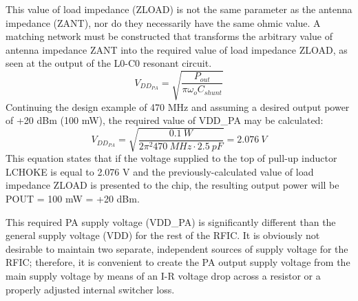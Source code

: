         This value of load impedance (ZLOAD) is not the same parameter as the antenna impedance (ZANT), nor 
        do they necessarily have the same ohmic value. A matching network must be constructed that 
        transforms the arbitrary value of antenna impedance ZANT into the required value of load impedance 
        ZLOAD, as seen at the output of the L0-C0 resonant circuit.
        \begin{equation}\label{EXP001:eq_spirit05}
          V_{DD_{PA}} = \sqrt{\frac{P_{out}}{\pi\omega_oC_{shunt}}}
        \end{equation}
        Continuing the design example of 470 MHz and assuming a desired output power of +20 dBm (100 mW), 
        the required value of VDD\_PA may be calculated:
        \begin{equation}\label{EXP001:eq_spirit06}
          V_{DD_{PA}} =\sqrt{\frac{\SI{0.1}{W}}{2\pi^2\SI{470}{MHz}\cdot\SI{2.5}{pF}}} = \SI{2.076}{V}
        \end{equation}
        This equation states that if the voltage supplied to the top of pull-up inductor LCHOKE is equal to 
        2.076 V and the previously-calculated value of load impedance ZLOAD is presented to the chip, the 
        resulting output power will be POUT = 100 mW = +20 dBm.
        
        This required PA supply voltage (VDD\_PA) is significantly different than the general supply 
        voltage (VDD) for the rest of the RFIC. It is obviously not desirable to maintain two separate, 
        independent sources of supply voltage for the RFIC; therefore, it is convenient to create the PA 
        output supply voltage from the main supply voltage by means of an I-R voltage drop across a 
        resistor or a properly adjusted internal switcher loss.
        
